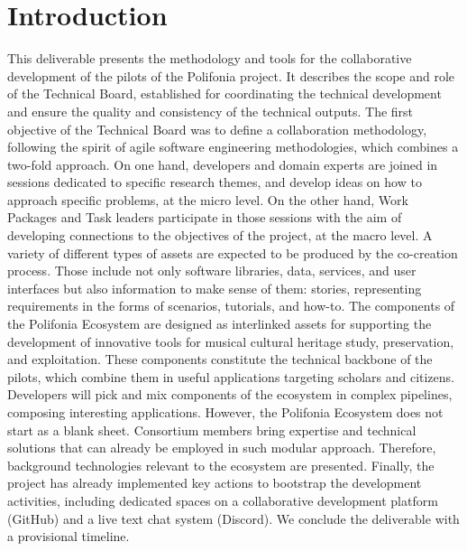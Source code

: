 \chapter{Introduction}\label{ch:introduction}
This deliverable presents the methodology and tools for the collaborative development of the pilots of the Polifonia project. 
It describes the scope and role of the Technical Board, established for coordinating the technical development and ensure the quality and consistency of the technical outputs. 
The first objective of the Technical Board was to define a collaboration methodology, following the spirit of agile software engineering methodologies, which combines a two-fold approach. 
On one hand, developers and domain experts are joined in sessions dedicated to specific research themes, and develop ideas on how to approach specific problems, at the micro level. 
On the other hand, Work Packages and Task leaders participate in those sessions with the aim of developing connections to the objectives of the project, at the macro level. 
A variety of different types of assets are expected to be produced by the co-creation process. 
Those include not only software libraries, data, services, and user interfaces but also information to make sense of them: stories, representing requirements in the forms of scenarios, tutorials, and how-to. 
The components of the Polifonia Ecosystem are designed as interlinked assets for supporting the development of innovative tools for musical cultural heritage study, preservation, and exploitation. 
These components constitute the technical backbone of the pilots, which combine them in useful applications targeting scholars and citizens. Developers will pick and mix components of the ecosystem in complex pipelines, composing interesting applications. 
However, the Polifonia Ecosystem does not start as a blank sheet. 
Consortium members bring expertise and technical solutions that can already be employed in such modular approach. Therefore, background technologies relevant to the ecosystem are presented. 
Finally, the project has already implemented key actions to bootstrap the development activities, including dedicated spaces on a collaborative development platform (GitHub) and a live text chat system (Discord). 
We conclude the deliverable with a provisional timeline.